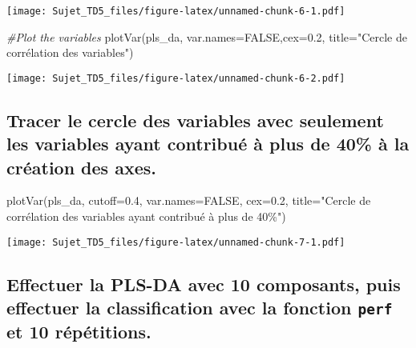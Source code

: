 \documentclass[
]{article}
\newenvironment{Shaded}{\begin{snugshade}}{\end{snugshade}}
\newcommand{\AttributeTok}[1]{\textcolor[rgb]{0.77,0.63,0.00}{#1}}
\newcommand{\CommentTok}[1]{\textcolor[rgb]{0.56,0.35,0.01}{\textit{#1}}}
\newcommand{\ConstantTok}[1]{\textcolor[rgb]{0.00,0.00,0.00}{#1}}
\newcommand{\FloatTok}[1]{\textcolor[rgb]{0.00,0.00,0.81}{#1}}
\newcommand{\FunctionTok}[1]{\textcolor[rgb]{0.00,0.00,0.00}{#1}}
\newcommand{\NormalTok}[1]{#1}
\newcommand{\StringTok}[1]{\textcolor[rgb]{0.31,0.60,0.02}{#1}}
\begin{document}
\texttt{[image: Sujet\_TD5\_files/figure-latex/unnamed-chunk-6-1.pdf]}

\begin{Shaded}
\begin{Highlighting}[]
\CommentTok{\#Plot the variables}
\FunctionTok{plotVar}\NormalTok{(pls\_da, }\AttributeTok{var.names=}\ConstantTok{FALSE}\NormalTok{,}\AttributeTok{cex=}\FloatTok{0.2}\NormalTok{, }\AttributeTok{title=}\StringTok{"Cercle de corrélation des variables"}\NormalTok{)}
\end{Highlighting}
\end{Shaded}

\texttt{[image: Sujet\_TD5\_files/figure-latex/unnamed-chunk-6-2.pdf]}

\hypertarget{tracer-le-cercle-des-variables-avec-seulement-les-variables-ayant-contribuuxe9-uxe0-plus-de-40-uxe0-la-cruxe9ation-des-axes.}{%
\subsection{Tracer le cercle des variables avec seulement les variables
ayant contribué à plus de 40\% à la création des
axes.}\label{tracer-le-cercle-des-variables-avec-seulement-les-variables-ayant-contribuuxe9-uxe0-plus-de-40-uxe0-la-cruxe9ation-des-axes.}}

\begin{Shaded}
\begin{Highlighting}[]
\FunctionTok{plotVar}\NormalTok{(pls\_da, }\AttributeTok{cutoff=}\FloatTok{0.4}\NormalTok{, }\AttributeTok{var.names=}\ConstantTok{FALSE}\NormalTok{, }\AttributeTok{cex=}\FloatTok{0.2}\NormalTok{,}
        \AttributeTok{title=}\StringTok{"Cercle de corrélation des variables ayant contribué à plus de 40\%"}\NormalTok{)}
\end{Highlighting}
\end{Shaded}

\texttt{[image: Sujet\_TD5\_files/figure-latex/unnamed-chunk-7-1.pdf]}

\hypertarget{effectuer-la-pls-da-avec-10-composants-puis-effectuer-la-classification-avec-la-fonction-perf-et-10-ruxe9puxe9titions.}{%
\subsection{\texorpdfstring{Effectuer la PLS-DA avec 10 composants, puis
effectuer la classification avec la fonction \texttt{perf} et 10
répétitions.}{Effectuer la PLS-DA avec 10 composants, puis effectuer la classification avec la fonction perf et 10 répétitions.}}\label{effectuer-la-pls-da-avec-10-composants-puis-effectuer-la-classification-avec-la-fonction-perf-et-10-ruxe9puxe9titions.}}
\end{document}
